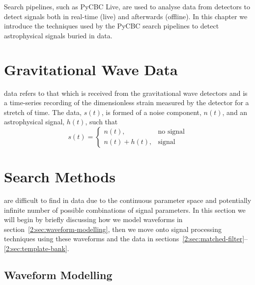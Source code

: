 %
Search pipelines, such as PyCBC Live, are used to analyse data from \gw detectors to detect \gw signals both in real-time (live) and afterwards (offline). In this chapter we introduce the techniques used by the PyCBC search pipelines to detect astrophysical signals buried in \gw data.

\section{\label{2:sec:gw-data}Gravitational Wave Data}

\Gw data refers to that which is received from the gravitational wave detectors and is a time-series recording of the dimensionless strain measured by the detector for a stretch of time. The data, $s(t)$, is formed of a noise component, $n(t)$, and an astrophysical signal, $h(t)$, such that
%
\begin{equation}
    s(t) =
    \begin{cases}
        n(t), & \text{no signal} \\
        n(t) + h(t), & \text{signal}
    \end{cases}
\end{equation}

\section{\label{2:sec:search-methods}Search Methods}
\Gws are difficult to find in \gw data due to the continuous parameter space and potentially infinite number of possible combinations of \gw signal parameters. In this section we will begin by briefly discussing how we model \gw waveforms in section~\ref{2:sec:waveform-modelling}, then we move onto signal processing techniques using these waveforms and the data in sections~\ref{2:sec:matched-filter}--\ref{2:sec:template-bank}.

\subsection{\label{2:sec:waveform-modelling}Waveform Modelling}


